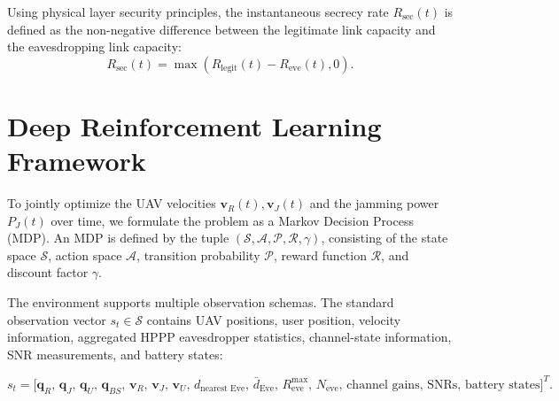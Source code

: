 \documentclass[journal,onecolumn]{IEEEtran}
\begin{document}
Using physical layer security principles, the instantaneous secrecy rate $R_{\text{sec}}(t)$ is defined as the non-negative difference between the legitimate link capacity and the eavesdropping link capacity:
\begin{equation}
    R_{\text{sec}}(t) = \max\left(R_{\text{legit}}(t) - R_{\text{eve}}(t), 0\right).
\end{equation}

\section{Deep Reinforcement Learning Framework}

To jointly optimize the UAV velocities $\mathbf{v}_R(t), \mathbf{v}_J(t)$ and the jamming power $P_J(t)$ over time, we formulate the problem as a Markov Decision Process (MDP). An MDP is defined by the tuple $(\mathcal{S}, \mathcal{A}, \mathcal{P}, \mathcal{R}, \gamma)$, consisting of the state space $\mathcal{S}$, action space $\mathcal{A}$, transition probability $\mathcal{P}$, reward function $\mathcal{R}$, and discount factor $\gamma$.

The environment supports multiple observation schemas. The standard observation vector $s_t \in \mathcal{S}$ contains UAV positions, user position, velocity information, aggregated HPPP eavesdropper statistics, channel-state information, SNR measurements, and battery states:

\begin{equation}
s_t =
\Big[
\mathbf{q}_R,\,
\mathbf{q}_J,\,
\mathbf{q}_U,\,
\mathbf{q}_{BS},\,
\mathbf{v}_R,\,
\mathbf{v}_J,\,
\mathbf{v}_U,\,
d_{\text{nearest Eve}},\,
\bar d_{\text{Eve}},\,
R_{\text{eve}}^{\max},\,
N_{\text{eve}},\,
\text{channel gains},\,
\text{SNRs},\,
\text{battery states}
\Big]^T.
\end{equation}

\end{document}
